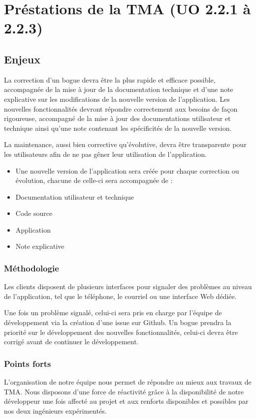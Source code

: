 	\section{Préstations de la TMA (UO 2.2.1 à 2.2.3)}
	\subsection{Enjeux}
	La correction d’un bogue devra être la plus rapide et efficace possible, accompagnée de la mise à jour de la documentation technique et d’une note explicative sur les modifications de la nouvelle version de l’application. 
	Les nouvelles fonctionnalités devront répondre correctement aux besoins de façon rigoureuse, accompagné de la mise à jour des documentations utilisateur et technique ainsi qu’une note contenant les spécificités de la nouvelle version.

	La maintenance, aussi bien corrective qu’évolutive, devra être transparente pour les utilisateurs afin de ne pas gêner leur utilisation de l’application. 
	
	\begin{itemize}
		\item Une nouvelle version de l’application sera créée pour chaque correction ou évolution, chacune de celle-ci sera accompagnée de : 
		\item Documentation utilisateur et technique
		\item Code source
		\item Application
		\item Note explicative
	\end{itemize}

	\subsubsection{Méthodologie}
	Les clients disposent de plusieurs interfaces pour signaler des problèmes au niveau de l’application, tel que le téléphone, le courriel ou une interface Web dédiée. 
	
	Une fois un problème signalé, celui-ci sera pris en charge par l’équipe de développement via la création d’une issue sur Github. Un bogue prendra la priorité sur le développement des nouvelles fonctionnalités, celui-ci devra être corrigé avant de continuer le développement. 
	
	\subsubsection{Points forts}
	L’organisation de notre équipe nous permet de répondre au mieux aux travaux de TMA. Nous disposons d’une force de réactivité grâce à la disponibilité de notre développeur une fois affecté au projet et aux renforts disponibles et possibles par nos deux ingénieurs expérimentés. 
	
